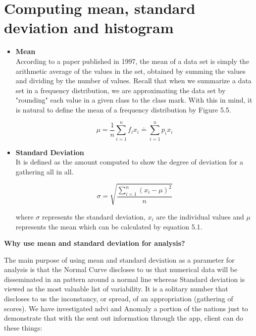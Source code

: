 \newpage

\section{Computing mean, standard deviation and histogram}

\begin{itemize}
    \item \textbf{Mean} \\
    According to a paper published in 1997, the mean of a data set is simply the arithmetic average of the values in the set, obtained by summing the values and dividing by the number of values. Recall that when we summarize a data set in a frequency distribution, we are approximating the data set by "rounding" each value in a given class to the class mark. With this in mind, it is natural to define the mean of a frequency distribution by Figure 5.5. \cite{Mean_SD}
    
    \begin{equation} \label{eq:mean_formula}
       \mu = \frac{1}{n} \sum\limits_{i=1}^{n}f_{i}x_{i} \doteq \sum\limits_{i=1}^{n}p_{i}x_{i}
    \end{equation}
    
    \item \textbf{Standard Deviation} \\
   It is defined as the amount computed to show the degree of deviation for a gathering all in all.
   
  \begin{equation} \label{eq:standarddeviation_formula}
      \sigma = \sqrt{\frac{\sum\limits_{i=1}^{n}(x_{i} - \mu)^2}{n}}
    \end{equation}
    

where $\sigma$ represents the standard deviation, $x_{i}$ are the individual values and $\mu$ represents the mean which can be calculated by equation 5.1.
    
\end{itemize}

\centerline{\textbf{Why use mean and standard deviation for analysis?}}

The main purpose of using mean and standard deviation as a parameter for analysis is that the Normal Curve discloses to us that numerical data will be disseminated in an pattern around a normal line whereas Standard deviation is viewed as the most valuable list of variability. It is a solitary number that discloses to us the inconstancy, or spread, of an appropriation (gathering of scores). We have investigated \gls{ndvi} and Anomaly a portion of the nations just to demonstrate that with the sent out information through the app, client can do these things:

